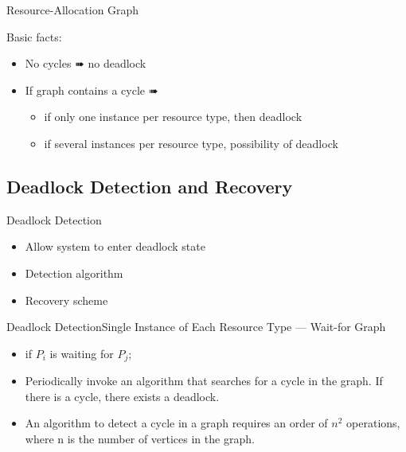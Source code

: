 \begin{frame}{Resource-Allocation Graph}
  \begin{minipage}{.29\linewidth}
    \begin{center}
    \end{center}
  \end{minipage}\hfill
  \begin{minipage}{.69\linewidth}
    \begin{block}{Basic facts:}
      \begin{itemize}
      \item No cycles {\symbola ➠} no deadlock
      \item If graph contains a cycle {\symbola ➠}
        \begin{itemize}
        \item if only one instance per resource type, then deadlock
        \item if several instances per resource type, possibility of deadlock
        \end{itemize}
      \end{itemize}
    \end{block}
  \end{minipage}
\end{frame}

\subsection{Deadlock Detection and Recovery}
\label{sec:deadl-detect-recov}

\begin{frame}{Deadlock Detection}
  \begin{itemize}
  \item Allow system to enter deadlock state
  \item Detection algorithm
  \item Recovery scheme
  \end{itemize}
\end{frame}

\begin{frame}{Deadlock Detection}{Single Instance of Each Resource Type --- Wait-for
    Graph}
  \centering
  \mode<beamer>{ \texttt{[image: osc-7-35]} }
  \begin{itemize}
  \item {} if $P_i$ is waiting for $P_j$;
  \item Periodically invoke an algorithm that searches for a cycle in the graph. If there
    is a cycle, there exists a deadlock.
  \item An algorithm to detect a cycle in a graph requires an order of $n^2$ operations,
    where n is the number of vertices in the graph.
  \end{itemize}
\end{frame}

